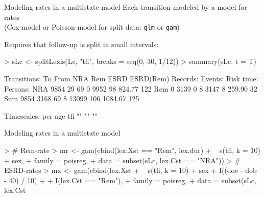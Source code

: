 \begin{frame}[fragile]{Modeling rates in a multistate model}
\pause
Each transition modeled by a model for rates\\ (Cox-model or
Poisson-model for split data: \texttt{glm} or \texttt{gam})

Requires that follow-up is split in small intervals:
\begin{Schunk}
\begin{Sinput}
> sLc <- splitLexis(Lc, "tfi", breaks = seq(0, 30, 1/12))
> summary(sLc, t = T)
\end{Sinput}
\begin{Soutput}
Transitions:
     To
From   NRA  Rem ESRD ESRD(Rem)  Records:  Events: Risk time:  Persons:
  NRA 9854   29   69         0      9952       98     824.77       122
  Rem    0 3139    0         8      3147        8     259.90        32
  Sum 9854 3168   69         8     13099      106    1084.67       125

Timescales:
per age tfi 
 ""  ""  "" 
\end{Soutput}
\end{Schunk}
\end{frame}

\begin{frame}[fragile]{Modeling rates in a multistate model}
\begin{Schunk}
\begin{Sinput}
> # Rem-rate
> mr <- gam(cbind(lex.Xst == "Rem", lex.dur)
+           ~ s(tfi, k = 10) + sex,
+           family = poisreg,
+             data = subset(sLc, lex.Cst == "NRA"))
> # ESRD-rates
> mx <- gam(cbind(lex.Xst %
+           ~ s(tfi, k = 10) + sex + I((doe - dob - 40) / 10) +
+                                    I(lex.Cst == "Rem"),
+           family = poisreg,
+             data = subset(sLc, lex.Cst %
\end{Sinput}
\end{Schunk}
\end{frame}

